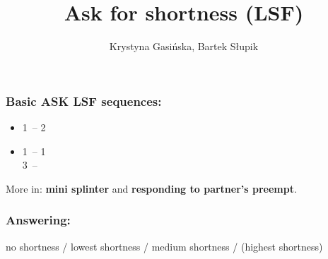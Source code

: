 \documentclass[12pt, a4paper]{article}
\title{Ask for shortness (LSF)}
\author{Krystyna Gasińska, Bartek Słupik}
\begin{document}
\maketitle


\subsubsection*{Basic ASK LSF sequences:}
\begin{itemize}
    \item 1\major\ -- 2\major\ \\ 
    \item 1\minor\ -- 1\major \\ 3\major\ -- 
\end{itemize}

More in: \textbf{mini splinter} and \textbf{responding to partner's preempt}.

\subsubsection*{Answering:}

no shortness / lowest shortness / medium shortness / (highest shortness)

\end{document}
